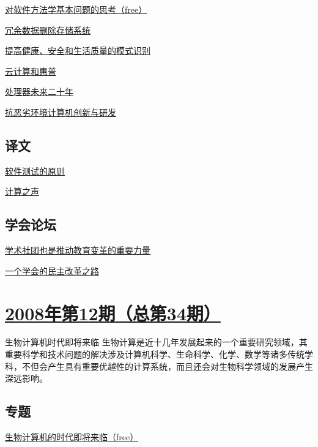 \documentclass[a4paper]{article}
\begin{document}
\href{http://history.ccf.org.cn/resources/1190201776262/2010/04/15/035031.pdf}{对软件方法学基本问题的思考（free）}

\href{http://history.ccf.org.cn/resources/1190201776262/2010/04/15/035035.pdf}{冗余数据删除存储系统}

\href{http://history.ccf.org.cn/resources/1190201776262/2010/04/15/035039.pdf}{提高健康、安全和生活质量的模式识别}

\href{http://history.ccf.org.cn/resources/1190201776262/2010/04/15/035043.pdf}{云计算和惠普}

\href{http://history.ccf.org.cn/resources/1190201776262/2010/04/15/035046.pdf}{处理器未来二十年}

\href{http://history.ccf.org.cn/resources/1190201776262/2010/04/15/035049.pdf}{抗恶劣环境计算机创新与研发}

\subsection{译文}
\href{http://history.ccf.org.cn/resources/1190201776262/2010/04/15/035054.pdf}{软件测试的原则}

\href{http://history.ccf.org.cn/resources/1190201776262/2010/04/15/035058.pdf}{计算之声}

\subsection{学会论坛}
\href{http://history.ccf.org.cn/resources/1190201776262/2010/04/15/035082.pdf}{学术社团也是推动教育变革的重要力量}

\href{http://history.ccf.org.cn/resources/1190201776262/2010/04/15/035078.pdf}{一个学会的民主改革之路}


\section{\href{http://history.ccf.org.cn/sites/ccf/jsjtbbd.jsp?contentId=2542567629019}{\textbf{2008年第12期（总第34期）}}}
生物计算机时代即将来临 生物计算是近十几年发展起来的一个重要研究领域，其重要科学和技术问题的解决涉及计算机科学、生命科学、化学、数学等诸多传统学科，不但会产生具有重要优越性的计算系统，而且还会对生物科学领域的发展产生深远影响。
\subsection{专题}
\href{http://history.ccf.org.cn/resources/1190201776262/2010/04/15/034012.pdf}{生物计算机的时代即将来临（free）}
\end{document}
